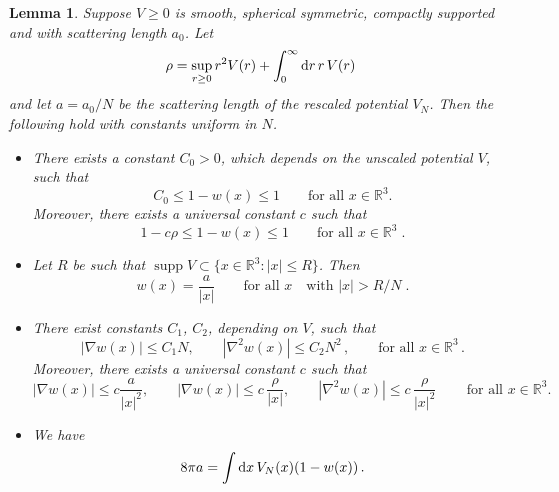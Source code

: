 \documentclass[11pt]{article}
\newtheorem{lemma}[theorem]{Lemma}
\newcommand{\rd}{{\rm d}}
\newcommand{\bR}{{\mathbb R}}
\newcommand{\supp}{\operatorname{supp}}
\begin{document}
\begin{lemma}\label{lm:w}
Suppose $V \geq 0$ is smooth, spherical symmetric, compactly
supported and with scattering length $a_0$. Let
\begin{equation}\label{eq:defrho1}
\rho = \sup_{r \geq 0} r^2 V(r) + \int_0^{\infty} \rd r \, r \, V(r)
\end{equation} and let $a=a_0/N$ be the scattering length of the rescaled
potential $V_N$. Then the following hold with constants uniform in
$N$.
\begin{itemize}
\item[i)] There exists a constant $C_0>0$, which depends on the unscaled potential
$V$, such that \begin{equation}\label{eq:w>01} C_0\leq 1-w(x) \leq 1
\qquad \text{for all } x \in \bR^3.\end{equation} Moreover, there
exists a universal constant $c$ such that
\begin{equation}\label{eq:w>0} 1-c\rho \leq 1 - w(x) \leq 1 \qquad
\text{for all } x \in \bR^3 \; .
\end{equation}
\item[ii)] Let $R$ be such that $\supp V \subset \{ x \in \bR^3 : |x| \leq R \}$. Then
\[ w(x) = \frac{a}{|x|} \qquad \text{for all } x \quad \text{with }
|x| > R/N \; .
\]
\item[iii)] There exist constants $C_1$, $C_2$, depending on $V$, such that
\begin{equation}\label{eq:w-1}
|\nabla w (x) | \leq C_1 N, \qquad  |\nabla^2 w(x)| \leq C_2 N^2\, ,
\qquad \text{for all } x \in \bR^3 \, .
\end{equation}
Moreover, there exists a universal constant $c$ such
that
\begin{equation}\label{eq:w-2}
|\nabla w(x)| \leq c \frac{a}{|x|^2}, \qquad |\nabla w(x)|  \leq c
\, \frac{\rho}{|x|}, \qquad |\nabla^2 w(x)| \leq c \,
\frac{\rho}{|x|^2}\, \qquad \text{for all } x \in \bR^3.
\end{equation}
\item[iv)] We have
\begin{equation}\label{eq:a_0}
8\pi a = \int \rd x \, V_N(x) (1-w(x))\,.
\end{equation}
\end{itemize}
\end{lemma}
\end{document}

